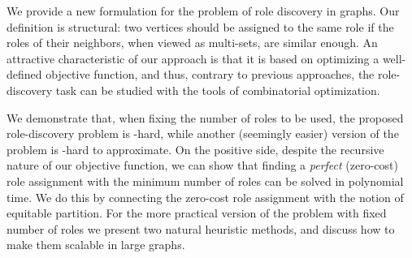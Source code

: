 We provide a new formulation for the 
problem of role discovery in graphs. 
Our definition is structural: 
two vertices should be assigned to the same role
if the roles of their neighbors, when viewed as multi-sets, are similar enough.
An attractive characteristic of our approach 
is that it is based on optimizing a well-defined objective function, 
and thus, contrary to previous approaches, 
the role-discovery task can be studied with the tools of combinatorial optimization.

We demonstrate that, when fixing the number of roles to be used, 
the proposed role-discovery problem is \np-hard, 
while another (seemingly easier) version of the problem is \np-hard to approximate.
On the positive side, 
despite the recursive nature of our objective function, 
we can show that finding a \emph{perfect} (zero-cost) role assignment
with the minimum number of roles can be solved in polynomial time. 
We do this by connecting the zero-cost role assignment with the notion of equitable partition.
For the more practical version of the problem with fixed number of roles
we present two natural heuristic methods, 
and discuss how to make them scalable in large graphs.
